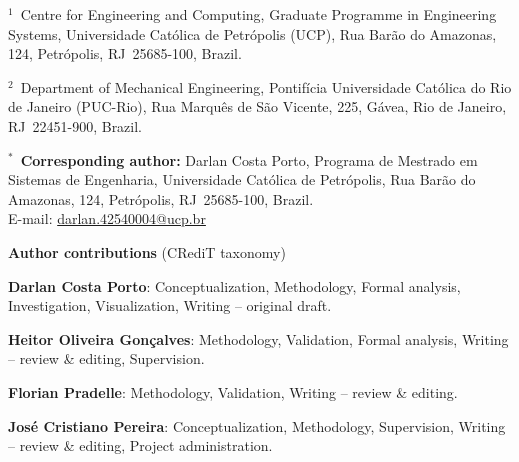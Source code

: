 \documentclass[11pt,a4paper]{article}
\begin{document}
\medskip

\noindent$^{1}$~Centre for Engineering and Computing, Graduate
Programme in Engineering Systems, Universidade Cat\'olica de
Petr\'opolis (UCP), Rua Bar\~ao do Amazonas, 124, Petr\'opolis,
RJ~25685-100, Brazil.

\medskip

\noindent$^{2}$~Department of Mechanical Engineering, Pontif\'icia
Universidade Cat\'olica do Rio de Janeiro (PUC-Rio), Rua Marqu\^es
de S\~ao Vicente, 225, G\'avea, Rio de Janeiro, RJ~22451-900, Brazil.

\bigskip\bigskip

\noindent$^{*}$~\textbf{Corresponding author:} Darlan Costa Porto,
Programa de Mestrado em Sistemas de Engenharia, Universidade
Cat\'olica de Petr\'opolis, Rua Bar\~ao do Amazonas, 124, Petr\'opolis,
RJ~25685-100, Brazil.\\
E-mail: \href{mailto:darlan.42540004@ucp.br}{darlan.42540004@ucp.br}

\bigskip\bigskip

\noindent\textbf{Author contributions} (CRediT taxonomy)

\medskip

\noindent\textbf{Darlan Costa Porto}: Conceptualization, Methodology,
Formal analysis, Investigation, Visualization, Writing -- original
draft.

\noindent\textbf{Heitor Oliveira Gon\c{c}alves}: Methodology,
Validation, Formal analysis, Writing -- review \& editing, Supervision.

\noindent\textbf{Florian Pradelle}: Methodology, Validation,
Writing -- review \& editing.

\noindent\textbf{Jos\'e Cristiano Pereira}: Conceptualization,
Methodology, Supervision, Writing -- review \& editing, Project
administration.
\end{document}
